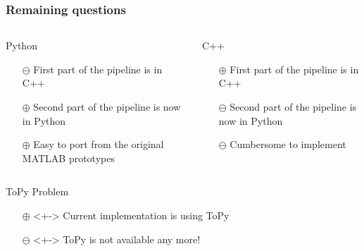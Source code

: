\begin{frame}

	\frametitle{Remaining questions}
	\begin{columns}[c] %

	\begin{block}{Python}
	\begin{itemize}
		\item[{\color{red}$\ominus$}] First part of the pipeline is in C++
		\item[{\color{green}$\oplus$}] Second part of the pipeline is now in Python
		\item[{\color{green}$\oplus$}] Easy to port from the original MATLAB prototypes

	\end{itemize}
	\end{block}

	\begin{block}{C++}	
	\begin{itemize}
		\item[{\color{green}$\oplus$}] First part of the pipeline is in C++
		\item[{\color{red}$\ominus$}] Second part of the pipeline is now in Python
		\item[{\color{red}$\ominus$}] Cumbersome to implement
	\end{itemize}
	\vspace{3.5mm}

	\end{block}
	\end{columns}
	\pause
	\begin{block}{ToPy Problem}
	\begin{itemize}
	\item[{\color{green}$\oplus$}]<+-> Current implementation is using ToPy
	\item[{\color{red}$\ominus$}]<+-> ToPy is not available any more!
	\end{itemize}
	\end{block}
	
\end{frame}









